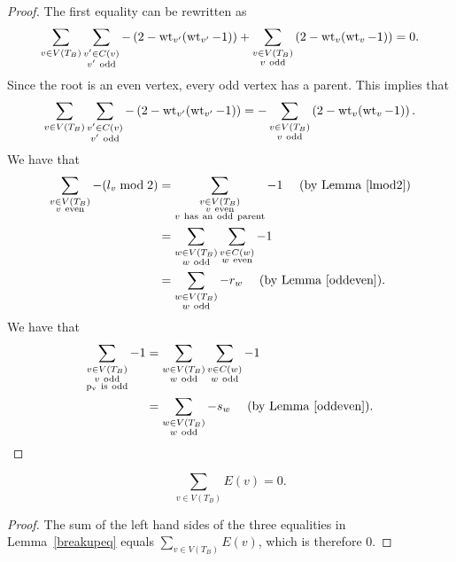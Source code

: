 \begin{proof} The first equality can be rewritten as
 \[ \sum_{v \in V(T_B)} \sum_{\substack{v' \in C(v) \\ v' \ \mathrm{odd}}} -\left( 2-  \operatorname{wt}_{v'}(\operatorname{wt}_{v'}-1)  \right) + \sum_{\substack{v \in V(T_B) \\ v \ \mathrm{odd}}} \left( 2 -  \operatorname{wt}_v(\operatorname{wt}_v-1)  \right)  = 0 .\]
Since the root is an even vertex, every odd vertex has a parent. This implies that 
\[ \sum_{v \in V(T_B)}  \sum_{\substack{v' \in C(v) \\ v' \ \mathrm{odd}}} -\left( 2-  \operatorname{wt}_{v'}(\operatorname{wt}_{v'}-1)  \right) = - \sum_{\substack{v \in V(T_B) \\ v \ \mathrm{odd}}} \left( 2 -  \operatorname{wt}_v(\operatorname{wt}_v-1)  \right)   .\]
 We have that
\begin{align*}
 \sum_{\substack{v \in V(T_B) \\ v \ \mathrm{even}}} -(l_v \bmod 2) &= \sum_{\substack{v \in V(T_B) \\ v \ \mathrm{even} \\ v \ \mathrm{has \ an \ odd \ parent}}} -1 \ \ \ \ (\mathrm{by\ Lemma~\ref{lmod2}}) \\
 &= \sum_{\substack{w \in V(T_B) \\ w \ \mathrm{odd}}} \sum_{\substack{v \in C(w) \\ w \ \mathrm{even}}}  -1  \\
 &= \sum_{\substack{w \in V(T_B) \\ w \ \mathrm{odd}}} -r_w \ \ \ \ (\mathrm{by\ Lemma~\ref{oddeven}}) .
\end{align*}
 We have that
\begin{align*}
 \sum_{\substack{v \in V(T_B) \\ v \ \mathrm{odd} \\ \mathrm{p_v\ is\ odd}}} -1 &= \sum_{\substack{w \in V(T_B) \\ w \ \mathrm{odd}}} \sum_{\substack{v \in C(w) \\ w \ \mathrm{odd}}}  -1  \\
 &= \sum_{\substack{w \in V(T_B) \\ w \ \mathrm{odd}}} -s_w \ \ \ \ (\mathrm{by\ Lemma~\ref{oddeven}}) . 
\end{align*} \qedhere
\end{proof}


\begin{lemma}\label{newsum}
\[ \sum_{v \in V(T_B)} E(v) = 0 .\] 
\end{lemma}
\begin{proof}
The sum of the left hand sides of the three equalities in Lemma~\ref{breakupeq} equals  $\sum_{v \in V(T_B)} E(v)$, which is therefore $0$.
\end{proof}


